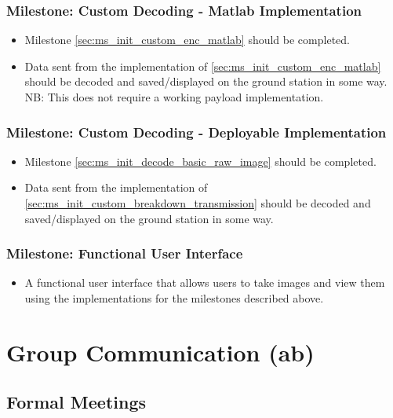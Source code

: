 	\subsubsection{Milestone: Custom Decoding - Matlab Implementation}
		\begin{itemize}
			\item 	Milestone \ref{sec:ms_init_custom_enc_matlab} should be completed.
			\item 	Data sent from the implementation of \ref{sec:ms_init_custom_enc_matlab} should be
				decoded and saved/displayed on the ground station in some way. NB: This does not require
				a working payload implementation.
		\end{itemize}

	\subsubsection{Milestone: Custom Decoding - Deployable Implementation}
		\begin{itemize}
			\item 	Milestone \ref{sec:ms_init_decode_basic_raw_image} should be completed.
			\item 	Data sent from the implementation of \ref{sec:ms_init_custom_breakdown_transmission} should be
				decoded and saved/displayed on the ground station in some way.
		\end{itemize}

	\subsubsection{Milestone: Functional User Interface}
		\begin{itemize}
			\item 	A functional user interface that allows users to take images and view them using the implementations
				for the milestones described above.
		\end{itemize}








\section{Group Communication (ab)}
\label{group_comms}
\subsection{Formal Meetings}

